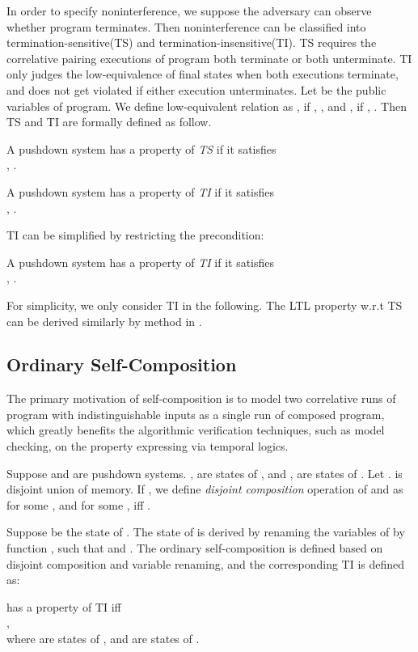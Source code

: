 \documentclass{llncs}
\begin{document}
In order to specify noninterference, we suppose the adversary can
observe whether program terminates. Then noninterference can be
classified into termination-sensitive(TS) and
termination-insensitive(TI). TS requires the correlative pairing
executions of program both terminate or both unterminate. TI only
judges the \textsf{low}-equivalence of final states when both
executions terminate, and does not get violated if either execution
unterminates. Let  be the public variables of
program. We define low-equivalent relation  as , if , , and , if ,
. Then TS and TI are formally defined as
follow.
\begin{definition}[TS]
A pushdown system  has a
property of \emph{TS} if it satisfies\\
\indent , .
\end{definition}
\begin{definition}[TI]
A pushdown system  has a
property of \emph{TI} if it satisfies\\
, .
\end{definition}
\indent TI can be simplified by restricting the precondition:
\begin{definition}[TI]
A pushdown system  has a
property of \emph{TI} if it satisfies\\
\indent , .
\end{definition}
For simplicity, we only consider TI in the following. The LTL
property w.r.t TS can be derived similarly by method in
\cite{DBLP:conf/csfw/BartheDR04}.

\subsection{\label{subsec:osc}Ordinary Self-Composition}

The primary motivation of self-composition is to model two
correlative runs of program with indistinguishable inputs as a
single run of composed program, which greatly benefits the
algorithmic verification techniques, such as model checking, on the
property expressing via temporal logics.

Suppose  and  are pushdown systems.
,  are states of , and ,
 are states of . Let . 
is disjoint union of memory. If , we
define \emph{disjoint composition} operation  of
 and
 as\\
 for some , and  for some , iff .

Suppose  be the state of
. The state of  is derived by
renaming the variables of  by function
, such
that  and . The
ordinary self-composition is defined based on disjoint composition
and variable renaming, and the corresponding TI is defined as:
\begin{definition}
 has a property of TI iff\\
\hspace*{\fill},\hspace*{\fill}\\
where  are states of , and
 are states of .
\end{definition}
\end{document}
